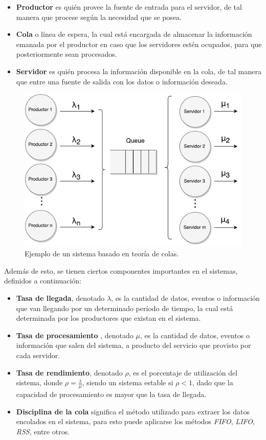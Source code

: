 \begin{itemize}
	\item \textbf{Productor} es quién provee la fuente de entrada para el servidor, de tal manera que procese según la necesidad que se posea.
	\item \textbf{Cola} o línea de espera, la cual está encargada de almacenar la información emanada por el productor en caso que los servidores estén ocupados, para que posteriormente sean procesados.
	\item \textbf{Servidor} es quién procesa la información disponible en la cola, de tal manera que entre una fuente de salida con los datos o información deseada.
\end{itemize}

\begin{figure}[!ht]
	\centering
	\includegraphics[scale=0.6]{images/TeoriaColas.pdf}
	\caption{Ejemplo de un sistema basado en teoría de colas.}
	\label{fig:teoriaColas}
\end{figure}

Además de esto, se tienen ciertos componentes importantes en el sistemas, definidos a continuación:
\begin{itemize}
	\item \textbf{Tasa de llegada}, denotado $\lambda$, es la cantidad de datos, eventos o información que van llegando por un determinado período de tiempo, la cual está determinada por los productores que existan en el sistema.
	\item \textbf{Tasa de procesamiento} , denotado $\mu$, es la cantidad de datos, eventos o información que salen del sistema, a producto del servicio que provisto por cada servidor.
	\item \textbf{Tasa de rendimiento}, denotado $\rho$, es el porcentaje de utilización del sistema, donde $\rho = \frac{\lambda}{\mu}$, siendo un sistema estable si $\rho < 1$, dado que la capacidad de procesamiento es mayor que la tasa de llegada.
	\item \textbf{Disciplina de la cola} significa el método utilizado para extraer los datos encolados en el sistema, para esto puede aplicarse los métodos \textit{FIFO}, \textit{LIFO}, \textit{RSS}, entre otros.
\end{itemize}

